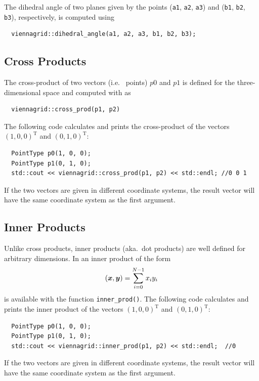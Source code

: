 The dihedral angle of two planes given by the points (\lstinline|a1|, \lstinline|a2|, \lstinline|a3|) and (\lstinline|b1|, \lstinline|b2|, \lstinline|b3|), respectively, is computed using
 \begin{lstlisting}
  viennagrid::dihedral_angle(a1, a2, a3, b1, b2, b3);
 \end{lstlisting}

  \subsection{Cross Products}
 The cross-product of two vectors (i.e.~{\ViennaGrid} points) $p0$ and $p1$ is defined for the three-dimensional space and computed with {\ViennaGrid} as
 \begin{lstlisting}
  viennagrid::cross_prod(p1, p2)
 \end{lstlisting}
 The following code calculates and prints the cross-product of the vectors $(1,0,0)^\mathrm{T}$ and $(0,1,0)^\mathrm{T}$:
 \begin{lstlisting}
  PointType p0(1, 0, 0);
  PointType p1(0, 1, 0);
  std::cout << viennagrid::cross_prod(p1, p2) << std::endl; //0 0 1
 \end{lstlisting}
 If the two vectors are given in different coordinate systems, the result vector will have the same coordinate system as the first argument.


  \subsection{Inner Products}
 Unlike cross products, inner products (aka.~dot products) are well defined for arbitrary dimensions. In {\ViennaGridversion} an inner product of the form
\begin{align}
 (\boldsymbol{x}, \boldsymbol{y}) = \sum_{i=0}^{N-1} x_i y_i
\end{align}
is available with the function \lstinline|inner_prod()|. The following code calculates and prints the inner product of the vectors $(1,0,0)^\mathrm{T}$ and $(0,1,0)^\mathrm{T}$:
 \begin{lstlisting}
  PointType p0(1, 0, 0);
  PointType p1(0, 1, 0);
  std::cout << viennagrid::inner_prod(p1, p2) << std::endl;  //0
 \end{lstlisting}
 If the two vectors are given in different coordinate systems, the result vector will have the same coordinate system as the first argument.

